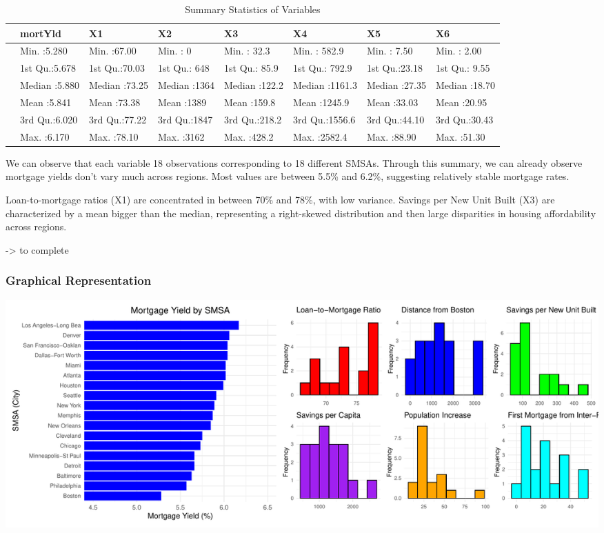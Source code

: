 \documentclass[
  11pt,
]{article}
\begin{document}
\begingroup\fontsize{8}{10}\selectfont

\begin{longtable}[t]{llllllll}
\caption{\label{tab:unnamed-chunk-3}Summary Statistics of Variables}\\
\toprule
 & mortYld & X1 & X2 & X3 & X4 & X5 & X6\\
\midrule
 & Min.   :5.280 & Min.   :67.00 & Min.   :   0 & Min.   : 32.3 & Min.   : 582.9 & Min.   : 7.50 & Min.   : 2.00\\
 & 1st Qu.:5.678 & 1st Qu.:70.03 & 1st Qu.: 648 & 1st Qu.: 85.9 & 1st Qu.: 792.9 & 1st Qu.:23.18 & 1st Qu.: 9.55\\
 & Median :5.880 & Median :73.25 & Median :1364 & Median :122.2 & Median :1161.3 & Median :27.35 & Median :18.70\\
 & Mean   :5.841 & Mean   :73.38 & Mean   :1389 & Mean   :159.8 & Mean   :1245.9 & Mean   :33.03 & Mean   :20.95\\
 & 3rd Qu.:6.020 & 3rd Qu.:77.22 & 3rd Qu.:1847 & 3rd Qu.:218.2 & 3rd Qu.:1556.6 & 3rd Qu.:44.10 & 3rd Qu.:30.43\\
\addlinespace
 & Max.   :6.170 & Max.   :78.10 & Max.   :3162 & Max.   :428.2 & Max.   :2582.4 & Max.   :88.90 & Max.   :51.30\\
\bottomrule
\end{longtable}
\endgroup{}

We can observe that each variable 18 observations corresponding to 18
different SMSAs. Through this summary, we can already observe mortgage
yields don't vary much across regions. Most values are between 5.5\% and
6.2\%, suggesting relatively stable mortgage rates.

Loan-to-mortgage ratios (X1) are concentrated in between 70\% and 78\%,
with low variance. Savings per New Unit Built (X3) are characterized by
a mean bigger than the median, representing a right-skewed distribution
and then large disparities in housing affordability across regions.

-\textgreater{} to complete

\subsubsection{Graphical Representation}\label{graphical-representation}

\includegraphics{Figs/unnamed-chunk-4-1.pdf}
\end{document}

